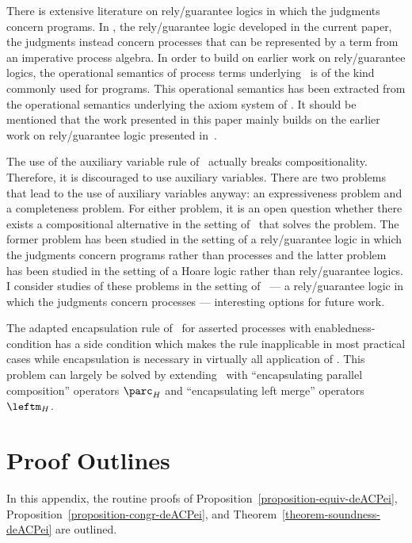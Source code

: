 \documentclass[runningheads]{llncs}
\begin{document}
There is extensive literature on rely/guarantee logics in which the 
judgments concern programs.
In \RG, the rely/guarantee logic developed in the current paper, the 
judgments instead concern processes that can be represented by a term 
from an imperative process algebra.
In order to build on earlier work on rely/guarantee logics, the 
operational semantics of process terms underlying \RG\ is of the kind 
commonly used for programs.
This operational semantics has been extracted from the operational 
semantics underlying the axiom system of \deACPei.
It should be mentioned that the work presented in this paper mainly 
builds on the earlier work on rely/guarantee logic presented 
in~\cite{XRH97a}.

The use of the auxiliary variable rule of \RG\ actually breaks 
compositionality.
Therefore, it is discouraged to use auxiliary variables.
There are two problems that lead to the use of auxiliary variables 
anyway: an expressiveness problem and a completeness problem.
For either problem, it is an open question whether there exists a 
compositional alternative in the setting of \RG\ that solves the 
problem. 
The former problem has been studied in the setting of a rely/guarantee 
logic in which the judgments concern programs rather than processes and
the latter problem has been studied in the setting of a Hoare logic
rather than rely/guarantee logics.
I consider studies of these problems in the setting of \RG\ --- a 
rely/guarantee logic in which the judgments concern processes --- 
interesting options for future work.

The adapted encapsulation rule of \RG\ for asserted processes with 
enabledness-condition has a side condition which makes the rule 
inapplicable in most practical cases while encapsulation is necessary in
virtually all application of \deACPei.
This problem can largely be solved by extending \deACPei\ \linebreak[2] 
with ``encapsulating parallel composition'' operators $\parc_H$ and  
``encapsulating left merge'' operators $\leftm_H$.

\appendix

\section{Proof Outlines}
\label{appendix-proofs}
In this appendix, the routine proofs of 
Proposition~\ref{proposition-equiv-deACPei},
Proposition~\ref{proposition-congr-deACPei}, and
Theorem~\ref{theorem-soundness-deACPei} are outlined.
\end{document}
